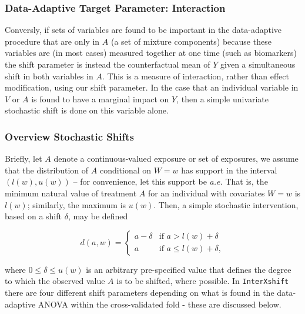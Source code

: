 \documentclass[
]{article}
\begin{document}
\hypertarget{data-adaptive-target-parameter-interaction}{%
\subsubsection{Data-Adaptive Target Parameter:
Interaction}\label{data-adaptive-target-parameter-interaction}}

Conversly, if sets of variables are found to be important in the
data-adaptive procedure that are only in \(A\) (a set of mixture
components) because these variables are (in most cases) measured
together at one time (such as biomarkers) the shift parameter is instead
the counterfactual mean of \(Y\) given a simultaneous shift in both
variables in \(A\). This is a measure of interaction, rather than effect
modification, using our shift parameter. In the case that an individual
variable in \(V\) or \(A\) is found to have a marginal impact on \(Y\),
then a simple univariate stochastic shift is done on this variable
alone.

\hypertarget{overview-stochastic-shifts}{%
\subsubsection{Overview Stochastic
Shifts}\label{overview-stochastic-shifts}}

Briefly, let \(A\) denote a continuous-valued exposure or set of
exposures, we assume that the distribution of \(A\) conditional on
\(W = w\) has support in the interval \((l(w), u(w))\) -- for
convenience, let this support be \emph{a.e.} That is, the minimum
natural value of treatment \(A\) for an individual with covariates
\(W = w\) is \(l(w)\); similarly, the maximum is \(u(w)\). Then, a
simple stochastic intervention, based on a shift \(\delta\), may be
defined

\begin{equation}\label{eqn:shift}
  d(a, w) =
  \begin{cases}
    a - \delta & \text{if } a > l(w) + \delta \\
    a & \text{if } a \leq l(w) + \delta,
  \end{cases}
\end{equation}

where \(0 \leq \delta \leq u(w)\) is an arbitrary pre-specified value
that defines the degree to which the observed value \(A\) is to be
shifted, where possible. In \texttt{InterXshift} there are four different
shift parameters depending on what is found in the data-adaptive ANOVA
within the cross-validated fold - these are discussed below.
\end{document}

